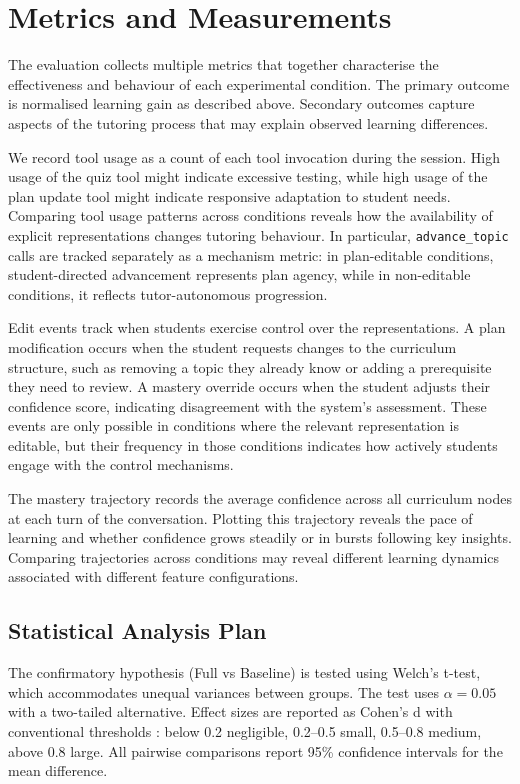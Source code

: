 \documentclass[logo,bsc,singlespacing,parskip,online]{infthesis}
\begin{document}
\section{Metrics and Measurements}

The evaluation collects multiple metrics that together characterise the effectiveness and behaviour of each experimental condition. The primary outcome is normalised learning gain as described above. Secondary outcomes capture aspects of the tutoring process that may explain observed learning differences.

We record tool usage as a count of each tool invocation during the session. High usage of the quiz tool might indicate excessive testing, while high usage of the plan update tool might indicate responsive adaptation to student needs. Comparing tool usage patterns across conditions reveals how the availability of explicit representations changes tutoring behaviour. In particular, \texttt{advance\_topic} calls are tracked separately as a mechanism metric: in plan-editable conditions, student-directed advancement represents plan agency, while in non-editable conditions, it reflects tutor-autonomous progression.

Edit events track when students exercise control over the representations. A plan modification occurs when the student requests changes to the curriculum structure, such as removing a topic they already know or adding a prerequisite they need to review. A mastery override occurs when the student adjusts their confidence score, indicating disagreement with the system's assessment. These events are only possible in conditions where the relevant representation is editable, but their frequency in those conditions indicates how actively students engage with the control mechanisms.

The mastery trajectory records the average confidence across all curriculum nodes at each turn of the conversation. Plotting this trajectory reveals the pace of learning and whether confidence grows steadily or in bursts following key insights. Comparing trajectories across conditions may reveal different learning dynamics associated with different feature configurations.

\subsection{Statistical Analysis Plan}

The confirmatory hypothesis (Full vs Baseline) is tested using Welch's t-test, which accommodates unequal variances between groups. The test uses $\alpha = 0.05$ with a two-tailed alternative. Effect sizes are reported as Cohen's d with conventional thresholds \citep{cohen1988power}: below 0.2 negligible, 0.2--0.5 small, 0.5--0.8 medium, above 0.8 large. All pairwise comparisons report 95\% confidence intervals for the mean difference.
\end{document}
